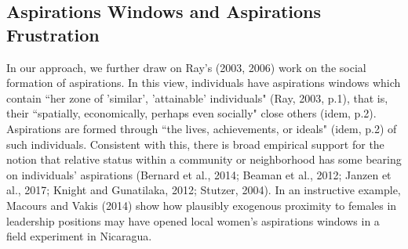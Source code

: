 \documentclass[11.5pt]{article}
\begin{document}

\subsection{Aspirations Windows and Aspirations Frustration}

In our approach, we further draw on Ray's (2003, 2006) work on the social formation of aspirations. In this view, individuals have aspirations windows which contain ``her zone of 'similar', 'attainable' individuals" (Ray, 2003, p.1), that is, their ``spatially, economically, perhaps even socially" close others (idem, p.2). Aspirations are formed through ``the lives, achievements, or ideals" (idem, p.2) of such individuals. Consistent with this, there is broad empirical support for the notion that relative status within a community or neighborhood has some bearing on individuals' aspirations (Bernard et al., 2014; Beaman et al., 2012; Janzen et al., 2017; Knight and Gunatilaka, 2012; Stutzer, 2004). In an instructive example, Macours and Vakis (2014) show how plausibly exogenous proximity to females in leadership positions may have opened local women's aspirations windows in a field experiment in Nicaragua.
\end{document}
